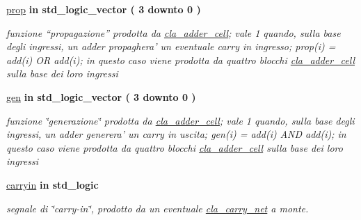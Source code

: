  \begin{DoxyCompactItemize}
\item 
\hyperlink{group___carry_network_gac1f84cd3374a5a4d2ee2669ebdadafe8}{prop}  {\bfseries {\bfseries \textcolor{vhdlchar}{in}\textcolor{vhdlchar}{ }}} {\bfseries \textcolor{vhdlchar}{std\+\_\+logic\+\_\+vector}\textcolor{vhdlchar}{ }\textcolor{vhdlchar}{(}\textcolor{vhdlchar}{ }\textcolor{vhdlchar}{ } \textcolor{vhdldigit}{3} \textcolor{vhdlchar}{ }\textcolor{vhdlchar}{downto}\textcolor{vhdlchar}{ }\textcolor{vhdlchar}{ } \textcolor{vhdldigit}{0} \textcolor{vhdlchar}{ }\textcolor{vhdlchar}{)}\textcolor{vhdlchar}{ }} 
\begin{DoxyCompactList}\small\item\em funzione “propagazione” prodotta da \hyperlink{classcla__adder__cell}{cla\+\_\+adder\+\_\+cell}; vale 1 quando, sulla base degli ingressi, un adder propaghera' un eventuale carry in ingresso; prop(i) = add(i) O\+R add(i); in questo caso viene prodotta da quattro blocchi \hyperlink{classcla__adder__cell}{cla\+\_\+adder\+\_\+cell} sulla base dei loro ingressi \end{DoxyCompactList}\item 
\hyperlink{group___carry_network_ga1ff97daaf4e03defc21748593cacfaa7}{gen}  {\bfseries {\bfseries \textcolor{vhdlchar}{in}\textcolor{vhdlchar}{ }}} {\bfseries \textcolor{vhdlchar}{std\+\_\+logic\+\_\+vector}\textcolor{vhdlchar}{ }\textcolor{vhdlchar}{(}\textcolor{vhdlchar}{ }\textcolor{vhdlchar}{ } \textcolor{vhdldigit}{3} \textcolor{vhdlchar}{ }\textcolor{vhdlchar}{downto}\textcolor{vhdlchar}{ }\textcolor{vhdlchar}{ } \textcolor{vhdldigit}{0} \textcolor{vhdlchar}{ }\textcolor{vhdlchar}{)}\textcolor{vhdlchar}{ }} 
\begin{DoxyCompactList}\small\item\em funzione \char`\"{}generazione\char`\"{} prodotta da \hyperlink{classcla__adder__cell}{cla\+\_\+adder\+\_\+cell}; vale 1 quando, sulla base degli ingressi, un adder generera' un carry in uscita; gen(i) = add(i) A\+N\+D add(i); in questo caso viene prodotta da quattro blocchi \hyperlink{classcla__adder__cell}{cla\+\_\+adder\+\_\+cell} sulla base dei loro ingressi \end{DoxyCompactList}\item 
\hyperlink{group___carry_network_gaa556a73dc4a4de1a0d662b25adbcbe33}{carryin}  {\bfseries {\bfseries \textcolor{vhdlchar}{in}\textcolor{vhdlchar}{ }}} {\bfseries \textcolor{vhdlchar}{std\+\_\+logic}\textcolor{vhdlchar}{ }} 
\begin{DoxyCompactList}\small\item\em segnale di \char`\"{}carry-\/in\char`\"{}, prodotto da un eventuale \hyperlink{classcla__carry__net}{cla\+\_\+carry\+\_\+net} a monte. \end{DoxyCompactList}\item 

\end{DoxyCompactItemize}
